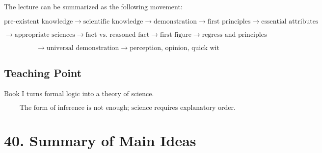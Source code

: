 \documentclass[12pt]{article}
\begin{document}
The lecture can be summarized as the following movement:

\[
\text{pre-existent knowledge}
\rightarrow
\text{scientific knowledge}
\rightarrow
\text{demonstration}
\rightarrow
\text{first principles}
\rightarrow
\text{essential attributes}
\]

\[
\rightarrow
\text{appropriate sciences}
\rightarrow
\text{fact vs. reasoned fact}
\rightarrow
\text{first figure}
\rightarrow
\text{regress and principles}
\]

\[
\rightarrow
\text{universal demonstration}
\rightarrow
\text{perception, opinion, quick wit}
\]

\subsection*{Teaching Point}

Book I turns formal logic into a theory of science.

\[
\boxed{
\text{The form of inference is not enough; science requires explanatory order.}
}
\]

\section*{40. Summary of Main Ideas}
\end{document}
